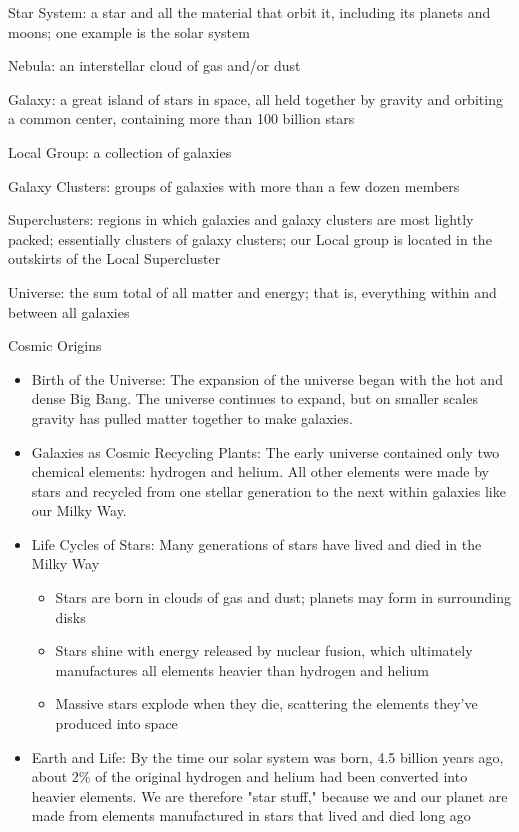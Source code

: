 \documentclass[12pt]{article}
\begin{document}
\begin{definition} Star System: a star and all the material that orbit it, including its planets and moons; one example is the solar system \end{definition} 
\begin{definition} Nebula: an interstellar cloud of gas and/or dust \end{definition} 
\begin{definition} Galaxy: a great island of stars in space, all held together by gravity and orbiting a common center, containing more than 100 billion stars \end{definition} 
\begin{definition} Local Group: a collection of galaxies \end{definition} 
\begin{definition} Galaxy Clusters: groups of galaxies with more than a few dozen members \end{definition} 
\begin{definition} Superclusters: regions in which galaxies and galaxy clusters are most lightly packed; essentially clusters of galaxy clusters; our Local group is located in the outskirts of the Local Supercluster \end{definition} 
\begin{definition} Universe: the sum total of all matter and energy; that is, everything within and between all galaxies \end{definition} 
Cosmic Origins \begin{itemize} 
\item Birth of the Universe: The expansion of the universe began with the hot and dense Big Bang. The universe continues to expand, but on smaller scales gravity has pulled matter together to make galaxies.
\item Galaxies as Cosmic Recycling Plants: The early universe contained only two chemical elements: hydrogen and helium. All other elements were made by stars and recycled from one stellar generation to the next within galaxies like our Milky Way. 
\item Life Cycles of Stars: Many generations of stars have lived and died in the Milky Way \begin{itemize} 
\item Stars are born in clouds of gas and dust; planets may form in surrounding disks 
\item Stars shine with energy released by nuclear fusion, which ultimately manufactures all elements heavier than hydrogen and helium
\item Massive stars explode when they die, scattering the elements they've produced into space \end{itemize} 
\item Earth and Life: By the time our solar system was born, 4.5 billion years ago, about 2\% of the original hydrogen and helium had been converted into heavier elements. We are therefore "star stuff," because we and our planet are made from elements manufactured in stars that lived and died long ago 
\end{itemize} 
\end{document}
